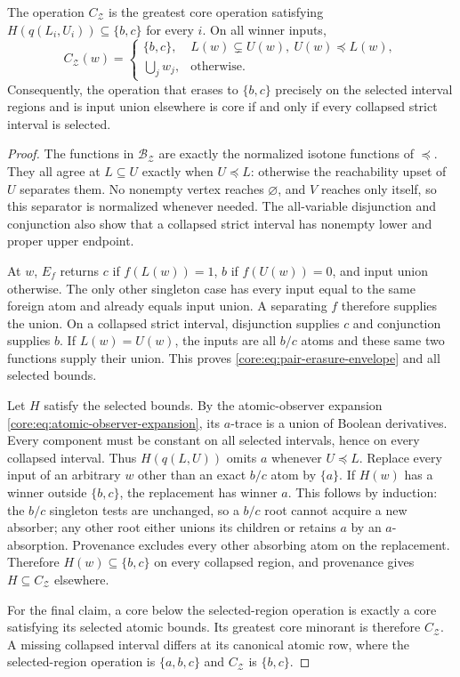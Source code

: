 \begin{theorem}
\label{core:thm:pair-erasure-envelope}
The operation $C_{\mathcal Z}$ is the greatest core operation satisfying
$H(q(L_i,U_i))\subseteq\{b,c\}$ for every $i$. On all winner inputs,
\begin{equation}\label{core:eq:pair-erasure-envelope}
 C_{\mathcal Z}(w)=
 \begin{cases}
 \{b,c\},&L(w)\subsetneq U(w),\ U(w)\preceq L(w),\\
 \bigcup_jw_j,&\text{otherwise}.
 \end{cases}
\end{equation}
Consequently, the operation that erases to $\{b,c\}$ precisely on the
selected interval regions and is input union elsewhere is core if and
only if every collapsed strict interval is selected.
\end{theorem}
\begin{proof}
The functions in $\mathcal B_{\mathcal Z}$ are exactly the normalized
isotone functions of $\preceq$. They all agree at $L\subseteq U$
exactly when $U\preceq L$: otherwise the reachability upset of $U$
separates them. No nonempty vertex reaches $\varnothing$, and $V$
reaches only itself, so this separator is normalized whenever needed.
The all-variable disjunction and conjunction also show that a collapsed
strict interval has nonempty lower and proper upper endpoint.

At $w$, $E_f$ returns $c$ if $f(L(w))=1$, $b$ if $f(U(w))=0$,
and input union otherwise. The only other singleton case has every
input equal to the same foreign atom and already equals input union.
A separating $f$ therefore supplies the union. On a collapsed strict
interval, disjunction supplies $c$ and conjunction supplies $b$.
If $L(w)=U(w)$, the inputs are all $b/c$ atoms and these same two
functions supply their union. This proves
\eqref{core:eq:pair-erasure-envelope} and all selected bounds.

Let $H$ satisfy the selected bounds. By the atomic-observer expansion
\eqref{core:eq:atomic-observer-expansion}, its $a$-trace is a union of
Boolean derivatives. Every component must be constant on all selected
intervals, hence on every collapsed interval. Thus $H(q(L,U))$ omits
$a$ whenever $U\preceq L$.
Replace every input of an arbitrary $w$ other than an exact $b/c$ atom
by $\{a\}$. If $H(w)$ has a winner outside $\{b,c\}$, the replacement
has winner $a$. This follows by induction: the $b/c$ singleton tests
are unchanged, so a $b/c$ root cannot acquire a new absorber; any other
root either unions its children or retains $a$ by an $a$-absorption.
Provenance excludes every other absorbing atom on the replacement.
Therefore $H(w)\subseteq\{b,c\}$ on every collapsed region, and
provenance gives $H\subseteq C_{\mathcal Z}$ elsewhere.

For the final claim, a core below the selected-region operation is
exactly a core satisfying its selected atomic bounds. Its greatest
core minorant is therefore $C_{\mathcal Z}$. A missing collapsed
interval differs at its canonical atomic row, where the selected-region
operation is $\{a,b,c\}$ and $C_{\mathcal Z}$ is $\{b,c\}$.
\end{proof}

